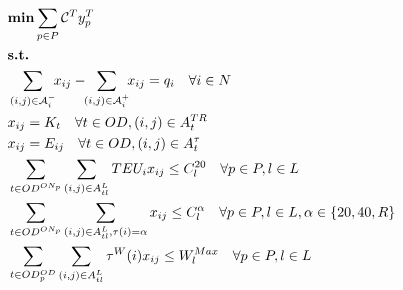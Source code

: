 \documentclass[preprint,12pt,authoryear]{elsarticle}
\begin{document}
\begin{align}
    & \text{\bf min} \sum_{p\in P}\mathcal{C}^Ty^T_p \label{chao:obj}\\
    & \text{\bf s.t.}\nonumber \\
    & \sum_{(i,j) \in \mathcal{A}^-_i}\!\! x_{ij} -\!\! \sum_{(i,j)\in \mathcal{A}^+_i}\!\! x_{ij} = q_i \quad \forall i \in N \label{chao:flow}\\
    & x_{ij} = K_t \quad \forall t \in OD, (i,j) \in A^{TR}_{t} \label{chao:od_pairs}\\
    & x_{ij} = E_{ij} \quad \forall t \in OD, (i,j) \in A^{\tau}_{t}\label{chao:types}\\
    & \sum_{t\in OD^{ON_p}}\sum_{(i,j)\in A^L_{tl}} TEU_i x_{ij} \leq C^{20}_l \quad \forall p\in P, l\in L\label{chao:cap_teu}\\
    & \sum_{t\in OD^{ON_p}}\sum_{(i,j)\in A^L_{tl},\tau(i)=\alpha}x_{ij} \leq C^\alpha_l \quad \forall p\in P, l\in L, \alpha \in \{20,40,R\}\label{chao:cap}\\
    & \sum_{t\in OD^{OD}_p}\sum_{(i,j)\in A^L_{tl}}\tau^W(i)x_{ij}\leq W^{Max}_l \quad \forall p\in P, l\in L \label{chao:cap_weight}\\

\end{align}
\end{document}

